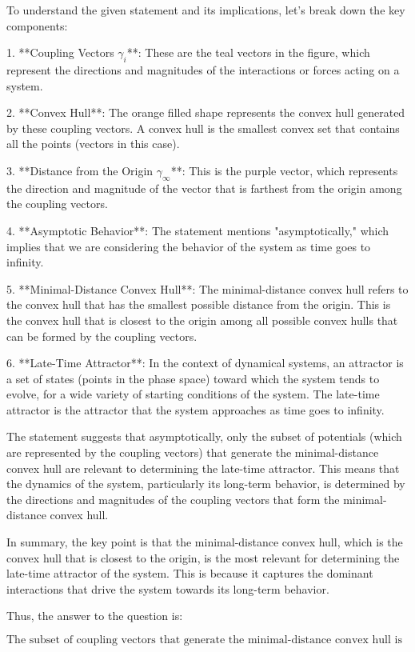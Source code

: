 To understand the given statement and its implications, let's break down the key components:

1. **Coupling Vectors \(\gamma_i\)**: These are the teal vectors in the figure, which represent the directions and magnitudes of the interactions or forces acting on a system.

2. **Convex Hull**: The orange filled shape represents the convex hull generated by these coupling vectors. A convex hull is the smallest convex set that contains all the points (vectors in this case).

3. **Distance from the Origin \(\gamma_\infty\)**: This is the purple vector, which represents the direction and magnitude of the vector that is farthest from the origin among the coupling vectors.

4. **Asymptotic Behavior**: The statement mentions "asymptotically," which implies that we are considering the behavior of the system as time goes to infinity.

5. **Minimal-Distance Convex Hull**: The minimal-distance convex hull refers to the convex hull that has the smallest possible distance from the origin. This is the convex hull that is closest to the origin among all possible convex hulls that can be formed by the coupling vectors.

6. **Late-Time Attractor**: In the context of dynamical systems, an attractor is a set of states (points in the phase space) toward which the system tends to evolve, for a wide variety of starting conditions of the system. The late-time attractor is the attractor that the system approaches as time goes to infinity.

The statement suggests that asymptotically, only the subset of potentials (which are represented by the coupling vectors) that generate the minimal-distance convex hull are relevant to determining the late-time attractor. This means that the dynamics of the system, particularly its long-term behavior, is determined by the directions and magnitudes of the coupling vectors that form the minimal-distance convex hull.

In summary, the key point is that the minimal-distance convex hull, which is the convex hull that is closest to the origin, is the most relevant for determining the late-time attractor of the system. This is because it captures the dominant interactions that drive the system towards its long-term behavior.

Thus, the answer to the question is:

\[
\boxed{\text{The subset of coupling vectors that generate the minimal-distance convex hull is relevant to determining the late-time attractor.}}
\]